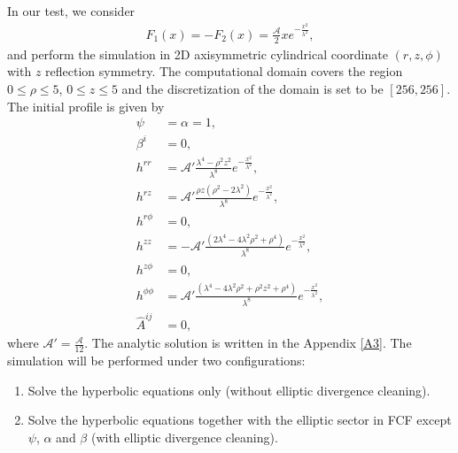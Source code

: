 In our test, we consider 
\begin{align}
    F_1 (x) = - F_2 (x) = \frac{\mathcal{A}}{2} x e^{-\frac{x^2}{\lambda^2}},
\end{align}
and perform the simulation in 2D axisymmetric cylindrical coordinate $(r,z,\phi)$ with $z$ reflection symmetry.
The computational domain covers the region $0\leq \rho \leq 5$, $0\leq z \leq 5$
and the discretization of the domain is set to be $[256,256]$.
The initial profile is given by
\begin{align}\label{eq:Teukolsky_wave_IC}
    \psi &= \alpha = 1, \\
    \beta^i &= 0, \\
    h^{rr} &= \mathcal{A}' \frac{\lambda^4 - \rho^2 z^2}{\lambda^8} e^{-\frac{x^2}{\lambda^2}}, \\
    h^{r z} &= \mathcal{A}' \frac{\rho z \left(\rho^2 - 2 \lambda^2 \right)}{\lambda^8} e^{-\frac{x^2}{\lambda^2}}, \\
    h^{r \phi} &= 0, \\
    h^{zz} &= - \mathcal{A}' \frac{\left(2 \lambda^4 - 4 \lambda^2 \rho^2 + \rho^4 \right)}{\lambda^8} e^{-\frac{x^2}{\lambda^2}}, \\
    h^{z\phi} &= 0, \\
    h^{\phi\phi} &= \mathcal{A}' \frac{\left(\lambda^4 - 4 \lambda^2 \rho^2 +\rho^2 z^2 + \rho^4 \right)}{\lambda^8} e^{-\frac{x^2}{\lambda^2}}, \\
    \hat{A}^{ij} &= 0,
\end{align}
where $\mathcal{A}' = \frac{\mathcal{A}}{12}$.
The analytic solution is written in the Appendix \ref{A3}.
The simulation will be performed under two configurations:
\begin{enumerate}
    \item Solve the hyperbolic equations only (without elliptic divergence cleaning).
    \label{TW_config_1}
    \item Solve the hyperbolic equations together with the elliptic sector in FCF except $\psi$, $\alpha$ and $\beta$ (with elliptic divergence cleaning).
    \label{TW_config_2}
\end{enumerate}
